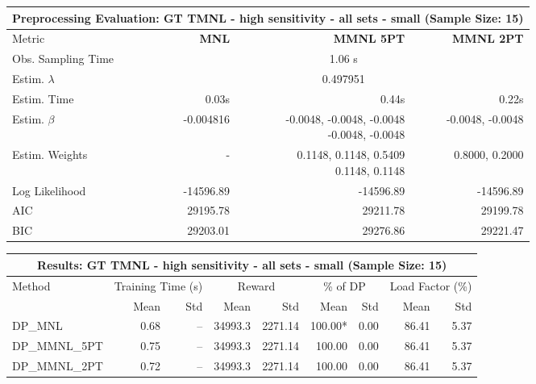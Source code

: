 
\begin{samepage}
\begin{center}
  \small
  \begin{tabular}{l|r|r|r}
    \toprule
    \multicolumn{4}{c}{\textbf{Preprocessing Evaluation: GT TMNL - high sensitivity - all sets - small (Sample Size: 15)}} \\
    \midrule
    Metric & \textbf{MNL} & \textbf{MMNL 5PT} & \textbf{MMNL 2PT} \\
    \midrule
    Obs. Sampling Time & \multicolumn{3}{c}{1.06 s} \\
    Estim. $\lambda$ & \multicolumn{3}{c}{0.497951} \\
    Estim. Time & 0.03s & 0.44s & 0.22s \\
    Estim. $\beta$ & -0.004816 & \makecell[tr]{-0.0048, -0.0048, -0.0048 \\ -0.0048, -0.0048} & -0.0048, -0.0048 \\
    Estim. Weights & - & \makecell[tr]{0.1148, 0.1148, 0.5409 \\ 0.1148, 0.1148} & 0.8000, 0.2000 \\
    Log Likelihood & -14596.89 & -14596.89 & -14596.89 \\
    AIC & 29195.78 & 29211.78 & 29199.78 \\
    BIC & 29203.01 & 29276.86 & 29221.47 \\
    \bottomrule
  \end{tabular}
\end{center}
\begin{center}
  \small
  \begin{tabular}{l|rr|rr|rr|rr}
    \toprule
    \multicolumn{9}{c}{\textbf{Results: GT TMNL - high sensitivity - all sets - small (Sample Size: 15)}} \\
    \midrule
    Method & \multicolumn{2}{c|}{Training Time (s)} & \multicolumn{2}{c|}{Reward} & \multicolumn{2}{c|}{\% of DP} & \multicolumn{2}{c}{Load Factor (\%)} \\
    & Mean & Std & Mean & Std & Mean & Std & Mean & Std \\
    \midrule
    DP\_MNL      &     0.68 &    -- &    34993.3 &    2271.14 & 100.00* &    0.00 &   86.41 &    5.37 \\
    DP\_MMNL\_5PT &     0.75 &    -- &    34993.3 &    2271.14 &  100.00 &    0.00 &   86.41 &    5.37 \\
    DP\_MMNL\_2PT &     0.72 &    -- &    34993.3 &    2271.14 &  100.00 &    0.00 &   86.41 &    5.37 \\

\end{tabular}
\end{center}
\end{samepage}
